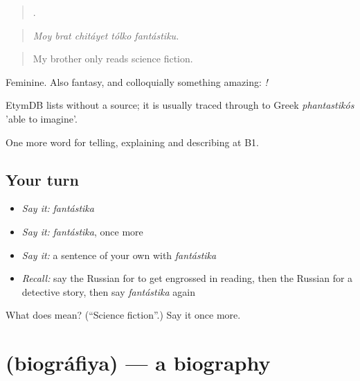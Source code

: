 \begin{quote}
    .
\end{quote}

\begin{quote}
\emph{Moy brat chitáyet tólko fantástiku.}
\end{quote}

\begin{quote}
My brother only reads science fiction.
\end{quote}

Feminine. Also fantasy, and colloquially something amazing: \emph{ !}

\begin{cousinweb}
EtymDB lists \emph{} without a source; it is usually traced through \emph{} to Greek \emph{phantastikós} 'able to imagine'.
\end{cousinweb}

\begin{grammarlens}[title={What you've built}]
One more word for telling, explaining and describing at B1.
\end{grammarlens}

\subsection*{Your turn}
\begin{itemize}
\raggedright
  \item \emph{Say it:} \emph{fantástika}
  \item \emph{Say it:} \emph{fantástika}, once more
  \item \emph{Say it:} a sentence of your own with \emph{fantástika}
  \item \emph{Recall:} say the Russian for to get engrossed in reading, then the Russian for a detective story, then say \emph{fantástika} again
\end{itemize}

\begin{tcolorbox}[breakable,colback=teal!4,colframe=teal!35!black,title={Before you move on}]
What does  mean? (\textquotedblleft{}Science fiction\textquotedblright{}.) Say it once more.
\end{tcolorbox}
\section[\texorpdfstring{\ru{биография} (biográfiya)}{биография (biográfiya)}]{ (biográfiya) — a biography}

